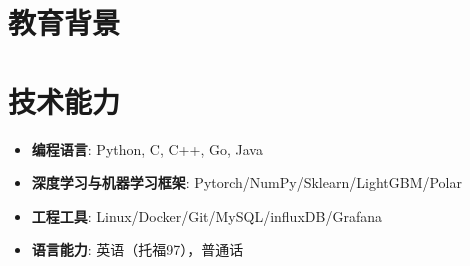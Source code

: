 \documentclass{resume}
\begin{document}



\section{教育背景}

\vspace{1em}
\section{技术能力}
\begin{itemize}[parsep=0.2ex]
  \item \textbf{编程语言}: Python, C, C++, Go, Java
  \item \textbf{深度学习与机器学习框架}: Pytorch/NumPy/Sklearn/LightGBM/Polar
  \item \textbf{工程工具}: Linux/Docker/Git/MySQL/influxDB/Grafana
  \item \textbf{语言能力}: 英语（托福97），普通话
\end{itemize}

\vspace{1em}
\end{document}
